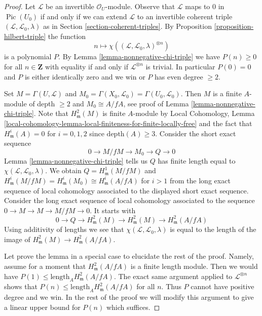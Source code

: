 \documentclass[10pt,a4paper]{amsart}
\theoremstyle{plain}
\theoremstyle{definition}
\theoremstyle{remark}
\numberwithin{equation}{subsection}
\def\Pic{\mathop{\mathrm{Pic}}\nolimits}
\begin{document}
\begin{proof}
Let $\mathcal{L}$ be an invertible $\mathcal{O}_U$-module.
Observe that $\mathcal{L}$ maps to $0$ in $\Pic(U_0)$
if and only if we can extend $\mathcal{L}$ to an invertible
coherent triple $(\mathcal{L}, \mathcal{L}_0, \lambda)$
as in Section \ref{section-coherent-triples}.
By Proposition \ref{proposition-hilbert-triple}
the function
$$
n \longmapsto \chi((\mathcal{L}, \mathcal{L}_0, \lambda)^{\otimes n})
$$
is a polynomial $P$. By Lemma \ref{lemma-nonnegative-chi-triple}
we have
$P(n) \geq 0$ for all $n \in \mathbf{Z}$ with equality if and only if
$\mathcal{L}^{\otimes n}$ is trivial. In particular $P(0) = 0$
and $P$ is either identically zero and we win or $P$ has even degree $\geq 2$.

\medskip\noindent
Set $M = \Gamma(U, \mathcal{L})$ and
$M_0 = \Gamma(X_0, \mathcal{L}_0) = \Gamma(U_0, \mathcal{L}_0)$.
Then $M$ is a finite $A$-module of depth $\geq 2$
and $M_0 \cong A/fA$, see proof of Lemma \ref{lemma-nonnegative-chi-triple}.
Note that $H^2_\mathfrak m(M)$ is finite $A$-module by
Local Cohomology, Lemma
\ref{local-cohomology-lemma-local-finiteness-for-finite-locally-free}
and the fact that $H^i_\mathfrak m(A) = 0$ for $i = 0, 1, 2$
since $\text{depth}(A) \geq 3$.
Consider the short exact sequence
$$
0 \to M/fM \to M_0 \to Q \to 0
$$
Lemma \ref{lemma-nonnegative-chi-triple} tells us $Q$ has finite length
equal to $\chi(\mathcal{L}, \mathcal{L}_0, \lambda)$.
We obtain $Q = H^1_\mathfrak m(M/fM)$ and
$H^i_\mathfrak m(M/fM) = H^i_\mathfrak m(M_0) \cong H^i_\mathfrak m(A/fA)$
for $i > 1$ from the long exact sequence of local cohomology
associated to the displayed short exact sequence. Consider the long
exact sequence of local cohomology associated to the sequence
$0 \to M \to M \to M/fM \to 0$. It starts with
$$
0 \to Q \to H^2_\mathfrak m(M) \to H^2_\mathfrak m(M) \to
H^2_\mathfrak m(A/fA)
$$
Using additivity of lengths we see that
$\chi(\mathcal{L}, \mathcal{L}_0, \lambda)$
is equal to the length of the image of
$H^2_\mathfrak m(M) \to H^2_\mathfrak m(A/fA)$.

\medskip\noindent
Let prove the lemma in a special case to elucidate the rest of the proof.
Namely, assume for a moment that $H^2_\mathfrak m(A/fA)$ is
a finite length module. Then
we would have $P(1) \leq \text{length}_A H^2_\mathfrak m(A/fA)$.
The exact same argument applied to $\mathcal{L}^{\otimes n}$ shows that
$P(n) \leq \text{length}_A H^2_\mathfrak m(A/fA)$ for all $n$.
Thus $P$ cannot have positive degree and we win.
In the rest of the proof we will modify this argument to give
a linear upper bound for $P(n)$ which suffices.


\end{proof}
\end{document}
